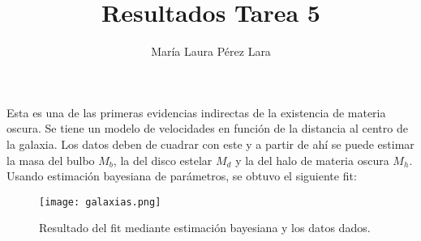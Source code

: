 \documentclass[a4paper,10pt]{article}
\begin{document}
\title{Resultados Tarea 5}

\author{María Laura Pérez Lara}

\maketitle
Esta es una de las primeras evidencias indirectas de la existencia de materia oscura. Se tiene un modelo de velocidades en función de la distancia al centro de la galaxia. Los datos deben de cuadrar con este y a partir de ahí se puede estimar la masa del bulbo $M_b$, la del disco estelar $M_d$ y la del halo de materia oscura $M_h$. \\

Usando estimación bayesiana de parámetros, se obtuvo el siguiente fit:

\begin{figure}[H]
    \centering
    \texttt{[image: galaxias.png]}
    \caption{Resultado del fit mediante estimación bayesiana y los datos dados.}
\end{figure}
\end{document}
